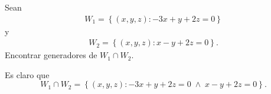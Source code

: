 \documentclass[handout]{beamer} %
\begin{document}
    
\begin{frame}
    \begin{ejemplo}
        Sean 
        \begin{align*}
            W_1 = \left\{ (x,y,z):  -3x + y + 2z = 0\right\}
        \end{align*}
        y
        \begin{align*}
                W_2 = \left\{ (x,y,z):  x - y + 2z = 0\right\}.
        \end{align*}
        Encontrar generadores de $W_1 \cap W_2$. 
    \end{ejemplo}  \pause
    \begin{solucion}  \pause
        Es claro que
        \begin{equation*}
            W_1 \cap W_2 = \left\{ (x,y,z):  -3x + y + 2z = 0 \;\wedge \;  x - y + 2z = 0\right\}.
        \end{equation*}
    \end{solucion}

    \end{frame}
\end{document}
